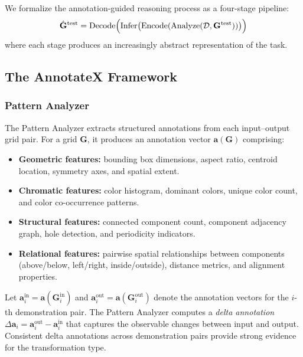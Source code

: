 \documentclass[conference,10pt,letterpaper]{IEEEtran}
\begin{document}
We formalize the annotation-guided reasoning process as a four-stage pipeline:
\begin{equation}
    \hat{\mathbf{G}}^{\text{test}} = \text{Decode}\Bigl(\text{Infer}\bigl(\text{Encode}(\text{Analyze}(\mathcal{D}, \mathbf{G}^{\text{test}}))\bigr)\Bigr)
\end{equation}
where each stage produces an increasingly abstract representation of the task.

\subsection{The AnnotateX Framework}

\subsubsection{Pattern Analyzer}

The Pattern Analyzer extracts structured annotations from each input--output grid pair. For a grid $\mathbf{G}$, it produces an annotation vector $\mathbf{a}(\mathbf{G})$ comprising:

\begin{itemize}[leftmargin=*,nosep]
    \item \textbf{Geometric features:} bounding box dimensions, aspect ratio, centroid location, symmetry axes, and spatial extent.
    \item \textbf{Chromatic features:} color histogram, dominant colors, unique color count, and color co-occurrence patterns.
    \item \textbf{Structural features:} connected component count, component adjacency graph, hole detection, and periodicity indicators.
    \item \textbf{Relational features:} pairwise spatial relationships between components (above/below, left/right, inside/outside), distance metrics, and alignment properties.
\end{itemize}

Let $\mathbf{a}_i^{\text{in}} = \mathbf{a}(\mathbf{G}_i^{\text{in}})$ and $\mathbf{a}_i^{\text{out}} = \mathbf{a}(\mathbf{G}_i^{\text{out}})$ denote the annotation vectors for the $i$-th demonstration pair. The Pattern Analyzer computes a \emph{delta annotation} $\Delta\mathbf{a}_i = \mathbf{a}_i^{\text{out}} - \mathbf{a}_i^{\text{in}}$ that captures the observable changes between input and output. Consistent delta annotations across demonstration pairs provide strong evidence for the transformation type.
\end{document}

